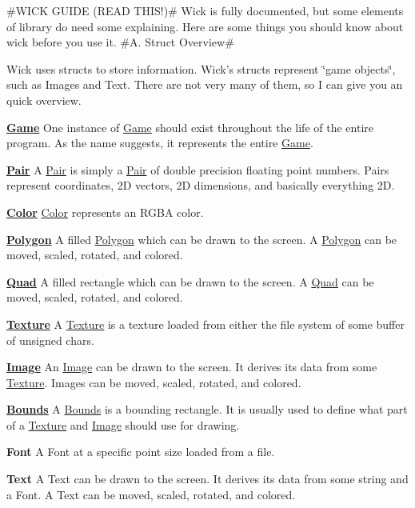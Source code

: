 \#\-W\-I\-C\-K G\-U\-I\-D\-E (R\-E\-A\-D T\-H\-I\-S!)\# Wick is fully documented, but some elements of library do need some explaining. Here are some things you should know about wick before you use it. \#\-A. Struct Overview\#

Wick uses structs to store information. Wick's structs represent \char`\"{}game objects\char`\"{}, such as Images and Text. There are not very many of them, so I can give you an quick overview.

{\bfseries \hyperlink{struct_game}{Game}} One instance of \hyperlink{struct_game}{Game} should exist throughout the life of the entire program. As the name suggests, it represents the entire \hyperlink{struct_game}{Game}.

{\bfseries \hyperlink{struct_pair}{Pair}} A \hyperlink{struct_pair}{Pair} is simply a \hyperlink{struct_pair}{Pair} of double precision floating point numbers. Pairs represent coordinates, 2\-D vectors, 2\-D dimensions, and basically everything 2\-D.

{\bfseries \hyperlink{struct_color}{Color}} \hyperlink{struct_color}{Color} represents an R\-G\-B\-A color.

{\bfseries \hyperlink{struct_polygon}{Polygon}} A filled \hyperlink{struct_polygon}{Polygon} which can be drawn to the screen. A \hyperlink{struct_polygon}{Polygon} can be moved, scaled, rotated, and colored.

{\bfseries \hyperlink{struct_quad}{Quad}} A filled rectangle which can be drawn to the screen. A \hyperlink{struct_quad}{Quad} can be moved, scaled, rotated, and colored.

{\bfseries \hyperlink{struct_texture}{Texture}} A \hyperlink{struct_texture}{Texture} is a texture loaded from either the file system of some buffer of unsigned chars.

{\bfseries \hyperlink{struct_image}{Image}} An \hyperlink{struct_image}{Image} can be drawn to the screen. It derives its data from some \hyperlink{struct_texture}{Texture}. Images can be moved, scaled, rotated, and colored.

{\bfseries \hyperlink{struct_bounds}{Bounds}} A \hyperlink{struct_bounds}{Bounds} is a bounding rectangle. It is usually used to define what part of a \hyperlink{struct_texture}{Texture} and \hyperlink{struct_image}{Image} should use for drawing.

{\bfseries Font} A Font at a specific point size loaded from a file.

{\bfseries Text} A Text can be drawn to the screen. It derives its data from some string and a Font. A Text can be moved, scaled, rotated, and colored.

